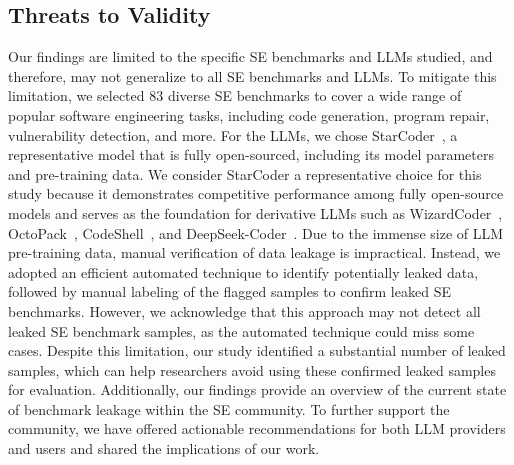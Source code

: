 \subsection{Threats to Validity}
Our findings are limited to the specific SE benchmarks and LLMs studied, and therefore, may not generalize to all SE benchmarks and LLMs. To mitigate this limitation, we selected 83 diverse SE benchmarks to cover a wide range of popular software engineering tasks, including code generation, program repair, vulnerability detection, and more. For the LLMs, we chose StarCoder~\cite{starcoder_one}, a representative model that is fully open-sourced, including its model parameters and pre-training data.
We consider StarCoder a representative choice for this study because it demonstrates competitive performance among fully open-source models and serves as the foundation for derivative LLMs such as WizardCoder~\cite{luo2023wizardcoder}, OctoPack~\cite{muennighoff2023octopack}, CodeShell~\cite{xie2024codeshell}, and DeepSeek-Coder~\cite{deepseekcoder}.
Due to the immense size of LLM pre-training data, manual verification of data leakage is impractical. Instead, we adopted an efficient automated technique to identify potentially leaked data, followed by manual labeling of the flagged samples to confirm leaked SE benchmarks. However, we acknowledge that this approach may not detect all leaked SE benchmark samples, as the automated technique could miss some cases. Despite this limitation, our study identified a substantial number of leaked samples, which can help researchers avoid using these confirmed leaked samples for evaluation. Additionally, our findings provide an overview of the current state of benchmark leakage within the SE community.
To further support the community, we have offered actionable recommendations for both LLM providers and users and shared the implications of our work.


